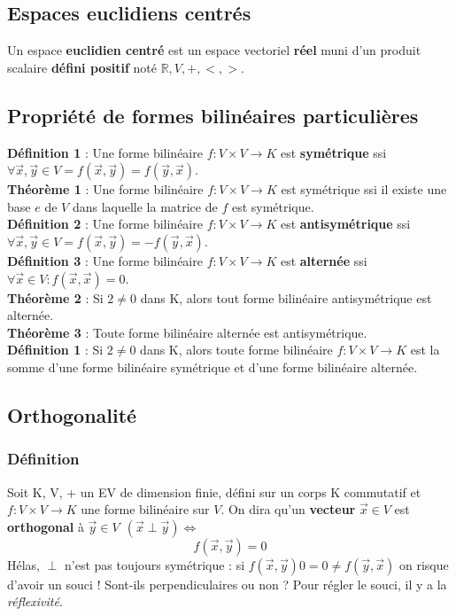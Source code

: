 \documentclass[12pt, a4paper]{article}
\begin{document}
\subsection{Espaces euclidiens centrés}
Un espace \textbf{euclidien centré} est un espace vectoriel \textbf{réel} muni d'un produit scalaire \textbf{défini positif} noté $\mathbb{R},V,+, < , >$.

\subsection{Propriété de formes bilinéaires particulières}
\textbf{Définition 1} : Une forme bilinéaire $f : V \times V \rightarrow K$ est \textbf{symétrique} ssi $\forall \vec{x}, \vec{y} \in V = f(\vec{x}, \vec{y}) = f(\vec{y}, \vec{x})$.\\

\textbf{Théorème 1} :
Une forme bilinéaire $f : V \times V \rightarrow K$ est symétrique ssi il existe une base $e$ de $V$ dans laquelle la matrice de $f$ est symétrique.\\

\textbf{Définition 2} : Une forme bilinéaire $f : V \times V \rightarrow K$ est \textbf{antisymétrique} ssi $\forall \vec{x}, \vec{y} \in V = f(\vec{x}, \vec{y}) = -f(\vec{y}, \vec{x})$.\\

\textbf{Définition 3} : Une forme bilinéaire $f : V \times V \rightarrow K$ est \textbf{alternée} ssi $\forall \vec{x} \in V : f(\vec{x}, \vec{x}) = 0$.\\

\textbf{Théorème 2} : Si $2 \neq 0$ dans K, alors tout forme bilinéaire antisymétrique est alternée.\\

\textbf{Théorème 3} : Toute forme bilinéaire alternée est antisymétrique.\\

\textbf{Définition 1} : Si $2 \neq 0$ dans K, alors toute forme bilinéaire $f : V \times V \rightarrow K$ est la somme d'une forme bilinéaire symétrique et d'une forme bilinéaire alternée.\\

\subsection{Orthogonalité}
\subsubsection*{Définition}
Soit K, V, + un EV de dimension finie, défini sur un corps K commutatif et $f : V \times V \rightarrow K$ une forme bilinéaire sur $V$. On dira qu'un \textbf{vecteur} $\vec{x} \in V$ est \textbf{orthogonal} à $\vec{y} \in V\ \ (\vec{x} \perp \vec{y}) \Leftrightarrow$
$$f(\vec{x}, \vec{y}) = 0$$
Hélas, $\perp$ n'est pas toujours symétrique : si $f(\vec{x}, \vec{y}) 0 = 0 \neq f(\vec{y},\vec{x})$ on risque d'avoir un souci ! Sont-ils perpendiculaires ou non ? Pour régler le souci, il y a la \textit{réflexivité}.
\end{document}
